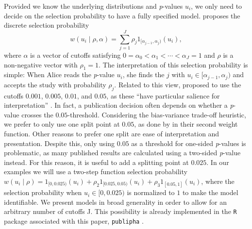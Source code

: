 \documentclass[useAMS,usenatbib,referee]{biom}
\begin{document}
Provided we know the underlying distributions and \textit{p}-values $u_i$, we only need to decide on the selection probability to have a fully specified model. \citet{hedges1992modeling} proposes the discrete selection probability
\begin{equation}
w(u_i\mid\rho,\alpha)=\sum_{j=1}^{J}\rho_{j}1_{[\alpha_{j-1},\alpha_{j})}(u_i),
\end{equation}
where $\alpha$ is a vector of cutoffs satisfying $0=\alpha_{0}<\alpha_{1}<\cdots<\alpha_{J}=1$ and $\rho$ is a non-negative vector with $\rho_{1}=1$. The interpretation of this selection probability is simple: When Alice reads the \textit{p}-value $u_i$, she finds the $j$ with $u_i\in[\alpha_{j-1},\alpha_{j})$ and accepts the study with probability $\rho_{j}$. Related to this view, \citet{hedges1992modeling} proposed %
to use the cutoffs $0.001$, $0.005$, $0.01$, and $0.05$, as these \enquote{have particular salience for interpretation} \citep{hedges1992modeling}. In fact, a publication decision often depends on whether a \textit{p}-value crosses the $0.05$-threshold. %
Considering the bias-variance trade-off heuristic, we prefer to only use one split point at $0.05$, as done by \citet{iyengar1988selection} in their second weight function. Other reasons to prefer one split are ease of interpretation and presentation. Despite this, only using $0.05$ as a threshold for one-sided \textit{p}-values is problematic, as many published results are calculated using a two-sided \textit{p}-value instead. For this reason, it is useful to add a splitting point at $0.025$. %
In our examples we will use a two-step function selection probability $w(u_i\mid\rho)=1_{[0,0.025)}(u_i)+\rho_{2}1_{[0.025,0.05)}(u_i)+\rho_{3}1_{\left[0.05,1\right]}(u_i)$, where the selection probability when $u_i\in[0,0.025)$ is normalized to $1$ to make the model identifiable. We present models in broad generality in order to allow for an arbitrary number of cutoffs J. This possibility is already implemented in the \texttt{R} package associated with this paper, \texttt{publipha} \citep{publipha}.
\end{document}
